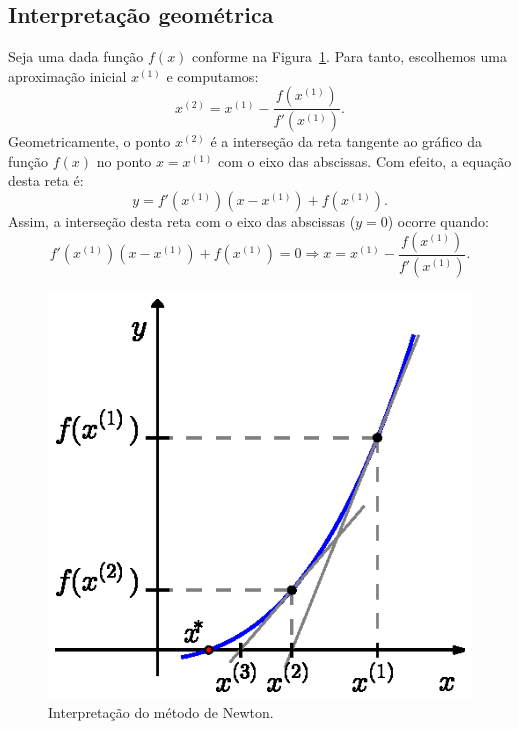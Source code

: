 \documentclass[
	12pt,				%
	oneside,			%
	a4paper,			%
	english,			%
	french,				%
	spanish,			%
	brazil				%
	]{abntex2}
\begin{document}
\subsection{Interpretação geométrica}

Seja uma dada função $f(x)$  conforme na Figura~\ref{fig:metodo_de_Newton}. Para tanto, escolhemos uma aproximação inicial $x^{(1)}$ e computamos:
\begin{equation}
  x^{(2)} = x^{(1)} - \dfrac{f(x^{(1)})}{f'(x^{(1)})}.
\end{equation}
Geometricamente, o ponto $x^{(2)}$ é a interseção da reta tangente ao gráfico da função $f(x)$ no ponto $x = x^{(1)}$ com o eixo das abscissas. Com efeito, a equação desta reta é:
\begin{equation}
  y = f'(x^{(1)})(x - x^{(1)}) + f(x^{(1)}).
\end{equation}
Assim, a interseção desta reta com o eixo das abscissas ($y=0$) ocorre quando:
\begin{equation}
  f'(x^{(1)})(x - x^{(1)}) + f(x^{(1)}) = 0\Rightarrow x = x^{(1)} - \dfrac{f(x^{(1)})}{f'(x^{(1)})}.
\end{equation}

\begin{figure}[h]
  \centering
  \includegraphics{metodo_de_Newton.eps}  
  \caption{Interpretação do método de Newton.}
  \label{fig:metodo_de_Newton}
\end{figure}
\end{document}
